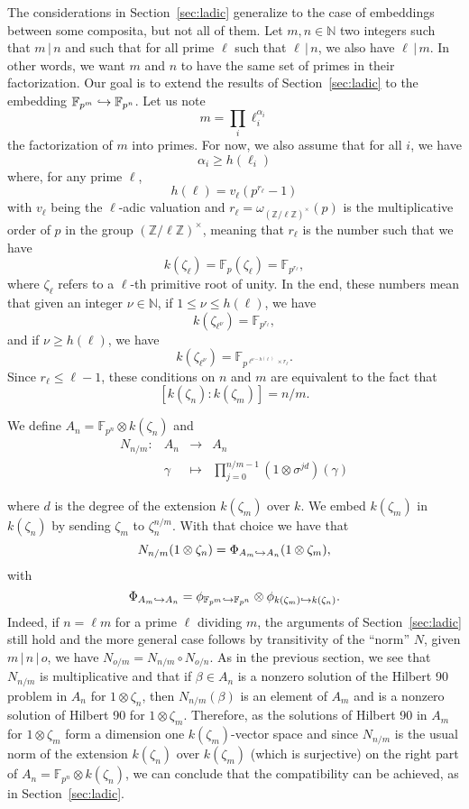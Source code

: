 \documentclass[a4paper,11pt]{article}
\begin{document}
The considerations in Section~\ref{sec:ladic} generalize to the case of
embeddings between some composita, but not all of them. Let $m, n\in\mathbb{N}$
two integers such that $m\,|\,n$ and such that for all prime $\ell$ such that
$\ell\,|\,n$, we also have $\ell\,|\,m$. In other words, we want $m$ and $n$ to
have the same set of primes in their factorization. Our goal is to extend the
results of Section~\ref{sec:ladic} to the embedding
$\mathbb{F}_{p^m}\hookrightarrow\mathbb{F}_{p^n}$. Let us note 
\[
  m = \prod_i \ell_i^{\alpha_i}
\]
the factorization of $m$ into primes. For now, we also assume that for all $i$,
we have 
\[
  \alpha_i\geq h(\ell_i)
\]
where, for any prime $\ell$, 
\[
  h(\ell) = v_\ell(p^{r_\ell}-1)
\]
with $v_\ell$ being the $\ell$-adic valuation and
$r_\ell=\omega_{(\mathbb{Z}/\ell\mathbb{Z})^\times}(p)$ is the multiplicative
order of $p$ in the group $(\mathbb{Z}/\ell\mathbb{Z})^\times$, meaning that
$r_\ell$ is the number such that we have 
\[
  k(\zeta_\ell)=\mathbb{F}_p(\zeta_\ell)=\mathbb{F}_{p^{r_\ell}},
\]
where $\zeta_\ell$ refers to a $\ell$-th primitive root of unity.
In the end, these numbers mean that given an integer $\nu\in\mathbb{N}$, if
$1\leq\nu\leq h(\ell)$, we have
\[
  k(\zeta_{\ell^\nu}) = \mathbb{F}_{p^{r_\ell}},
\]
and if $\nu\geq h(\ell)$, we have
\[
  k(\zeta_{\ell^\nu}) = \mathbb{F}_{p^{\ell^{\nu-h(\ell)}\times r_\ell}}.
\]
Since $r_\ell\leq\ell-1$, these conditions on $n$ and $m$ are equivalent to the fact that
\[
  [k(\zeta_n):k(\zeta_m)] = n/m.
\]

We define $A_n=\mathbb{F}_{p^n}\otimes k(\zeta_n)$ and
\[
\begin{array}{cccc}
  N_{n/m}: & A_n & \to & A_n \\
  & \gamma & \mapsto & \prod_{j=0}^{n/m-1} (1\otimes \sigma^{jd})(\gamma)
\end{array}
\]

where $d$ is the degree of the extension $k(\zeta_m)$ over $k$. We embed
$k(\zeta_m)$ in $k(\zeta_n)$ by sending $\zeta_m$ to $\zeta_n^{n/m}$. With that
choice we have that
\[
  N_{n/m}(1\otimes\zeta_n) = \Phi_{A_m\hookrightarrow A_n}(1\otimes\zeta_m),
\]
with 
\[
  \Phi_{A_m\hookrightarrow
  A_n}=\phi_{\mathbb{F}_{p^m}\hookrightarrow\mathbb{F}_{p^n}}\otimes\phi_{k(\zeta_m)\hookrightarrow
  k(\zeta_n)}.
\]
Indeed, if $n = \ell m$ for a prime $\ell$ dividing $m$, the arguments of
Section~\ref{sec:ladic} still hold and the more general case follows by
transitivity of the ``norm'' $N$, \ie given $m\,|\,n\,|\,o$, we have
$N_{o/m}=N_{n/m}\circ N_{o/n}$. As in the previous section, we see that
$N_{n/m}$ is multiplicative and that if $\beta\in A_n$ is a nonzero solution of
the Hilbert 90 problem in $A_n$ for $1\otimes\zeta_n$, then $N_{n/m}(\beta)$ is
an element of $A_m$ and is a nonzero solution of Hilbert 90 for
$1\otimes\zeta_m$. Therefore, as the solutions of Hilbert 90 in $A_m$ for
$1\otimes\zeta_m$ form a dimension one $k(\zeta_m)$-vector space and since
$N_{n/m}$ is the usual norm of the extension $k(\zeta_n)$ over $k(\zeta_m)$
(which is surjective) on the right part of $A_n=\mathbb{F}_{p^n}\otimes
k(\zeta_n)$, we can conclude that the compatibility can be achieved, as in
Section~\ref{sec:ladic}.
\end{document}
